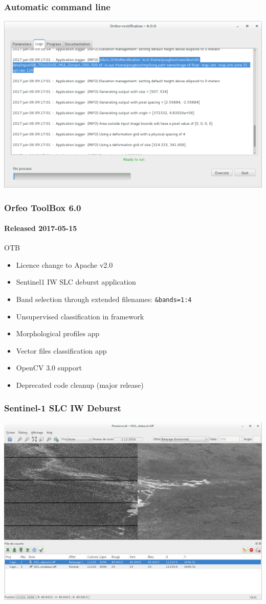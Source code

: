 \documentclass[smaller]{beamer}
\begin{document}
\begin{frame}
\frametitle{Automatic command line}
\includegraphics[width=1\textwidth]{images/automatic_command_line2.png}
\end{frame}

\begin{frame}
\frametitle{Orfeo ToolBox 6.0}
\framesubtitle{Released 2017-05-15}
  \begin{block}{OTB}
    \begin{itemize}
      \item Licence change to  Apache v2.0
      \item Sentinel1 IW SLC deburst application
      \item Band selection through extended filenames: \texttt{\&bands=1:4}
      \item Unsupervised classification in framework
      \item Morphological profiles app
      \item Vector files classification app
      \item OpenCV 3.0 support
      \item Deprecated code cleanup (major release)
    \end{itemize}
    \end{block}
\end{frame}

\begin{frame}
\frametitle{Sentinel-1 SLC IW Deburst}
\includegraphics[width=1\textwidth]{images/monteverdi_S1_deburst.png}
\end{frame}
\end{document}
